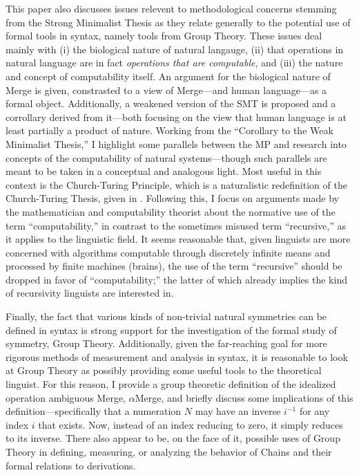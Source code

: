 \documentclass[11pt,twoside]{article}
\begin{document}
This paper also discusses issues relevent to methodological concerns stemming from the Strong Minimalist Thesis as they relate generally to the potential use of formal tools in syntax, namely tools from Group Theory. These issues deal mainly with (i) the biological nature of natural langauge, (ii) that operations in natural language are in fact \textsl{operations that are computable}, and (iii) the nature and concept of computability itself. An argument for the biological nature of Merge is given, constrasted to a view of Merge---and human language---as a formal object. Additionally, a weakened version of the SMT is proposed and a corrollary derived from it---both focusing on the view that human language is at least partially a product of nature. Working from the ``Corollary to the Weak Minimalist Thesis,'' I highlight some parallels between the MP and research into concepts of the computability of natural systems---though such parallels are meant to be taken in a conceptual and analogous light. Most useful in this context is the Church-Turing Principle, which is a naturalistic redefinition of the Church-Turing Thesis, given in \cite{deutsch:1985}. Following this, I focus on arguments made by the mathematician and computability theorist \cite{soare:1996,soare:2007,soare:2008} about the normative use of the term ``computability,'' in contrast to the sometimes misused term ``recursive,'' as it applies to the linguistic field. It seems reasonable that, given linguists are more concerned with algorithms computable through discretely infinite means and processed by finite machines (brains), the use of the term ``recursive'' should be dropped in favor of ``computability;'' the latter of which already implies the kind of recursivity linguists are interested in.

Finally, the fact that various kinds of non-trivial natural symmetries can be defined in syntax is strong support for the investigation of the formal study of symmetry, Group Theory. Additionally, given the far-reaching goal for more rigorous methods of measurement and analysis in syntax, it is reasonable to look at Group Theory as possibly providing some useful tools to the theoretical linguist. For this reason, I provide a group theoretic definition of the idealized operation ambiguous Merge, $\alpha$Merge, and briefly discuss some implications of this definition---specifically that a numeration $N$ may have an inverse $i^{-1}$ for any index $i$ that exists. Now, instead of an index reducing to zero, it simply reduces to its inverse. There also appear to be, on the face of it, possible uses of Group Theory in defining, measuring, or analyzing the behavior of Chains and their formal relations to derivations. 
   
\end{document}
